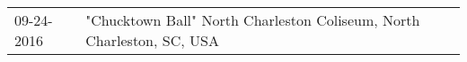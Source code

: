 \begin{supertabular}{ll}
 09-24-2016 &  "Chucktown Ball" North Charleston Coliseum, North Charleston, SC, USA \\
\end{supertabular}
